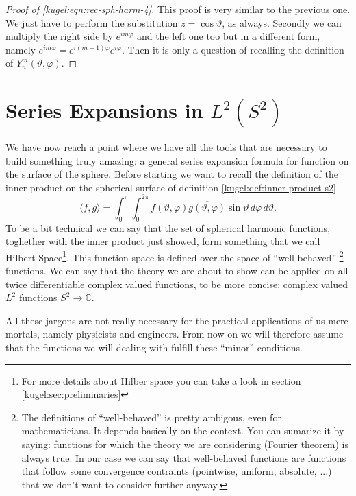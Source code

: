 \begin{proof}[Proof of \eqref{kugel:eqn:rec-sph-harm-4}]
  This proof is very similar to the previous one. We just have to perform the
  substitution $z = \cos \vartheta$, as always. Secondly we can multiply the
  right side by $e^{im\varphi}$ and the left one too but in a different form,
  namely $e^{im\varphi}=e^{i(m-1)\varphi}e^{i\varphi}$. Then it is only a
  question of recalling the definition of $Y^m_n(\vartheta, \varphi)$.
\end{proof}

\section{Series Expansions in $L^2(S^2)$}

We have now reach a point where we have all the tools that are necessary to
build something truly amazing: a general series expansion formula for function
on the surface of the sphere.  Before starting we want to recall the definition
of the inner product on the spherical surface of definition
\ref{kugel:def:inner-product-s2}
\begin{equation*}
  \langle f, g \rangle
  = \int_{0}^\pi \int_0^{2\pi}
    f(\vartheta, \varphi) \overline{g(\vartheta, \varphi)}
    \sin \vartheta \, d\varphi \, d\vartheta.
\end{equation*}
To be a bit technical we can say that the set of spherical harmonic functions, toghether with the inner product just showed, 
form something that we call Hilbert Space\footnote{For more details about Hilber space you can take a look in section \ref{kugel:sec:preliminaries}}. 
This function space is defined over the space of ``well-behaved'' \footnote{The definitions of ``well-behaved'' is pretty ambigous, even for mathematicians. 
It depends basically on the context.
You can sumarize it by saying: functions for which the theory we are considering (Fourier theorem) is always true. In our case we can say that well-behaved functions 
are functions that follow some convergence contraints (pointwise, uniform, absolute, ...) that we don't want to consider further anyway.} functions. 
We can say that the theory we are about to show can be applied on all twice differentiable complex valued functions, 
to be more concise: complex valued $L^2$ functions $S^2 \to \mathbb{C}$.

All these jargons are not really necessary for the practical applications of us mere mortals, namely physicists and engineers. 
From now on we will therefore assume that the functions we will dealing with fulfill these ``minor'' conditions.

